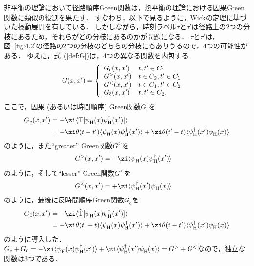 \documentclass[a4paper,10pt]{jsarticle}
\newcommand{\mH}{\mathrm{H}}
\begin{document}
非平衡の理論において径路順序Green関数は，熱平衡の理論における因果Green関数に類似の役割を果たす．
すなわち，以下で見るように，Wickの定理に基づいた摂動展開を有している．
しかしながら，時刻ラベル$\tau$と$\tau'$は径路上の2つの分枝にあるため，それらがどの分枝にあるのかが問題になる．
$\tau$と$\tau'$は，図~\ref{fig:4.2}の径路の2つの分枝のどちらの分枝にもありうるので，4つの可能性がある．
ゆえに，式~(\ref{def:G})は，4つの異なる関数を内包する．
\begin{align}
G (x, x')
	& = \left\{
	\begin{array}{l l}
		G_{\mathrm{c}} (x, x')
	&	t, t' \in C_1
	\\	G^{>} (x, x')
	&	t \in C_2, t' \in C_1
	\\	G^{<} (x, x')
	&	t \in C_1, t' \in C_2
	\\	G_{\tilde{\mathrm{c}}} (x, x')
	&	t, t' \in C_2
	.\end{array}
	\right.
\end{align}
ここで，因果 (あるいは時間順序) Green関数$G_{\mathrm{c}}$を
\begin{align}
G_{\mathrm{c}} (x, x')
	& = - \zi \langle \mathrm{T} [ \psi^{}_{\mH} (x) \psi^{\dagger}_{\mH} (x') ] \rangle
\notag \\
	& = - \zi \theta (t - t') \langle \psi^{}_{\mH} (x) \psi^{\dagger}_{\mH} (x') \rangle
		+ \zi \theta (t' - t) \langle \psi^{\dagger}_{\mH} (x') \psi^{}_{\mH} (x) \rangle
\label{def:G_c}
\end{align}
のように，また``greater'' Green関数$G^{>}$を
\begin{align}
G^{>} (x, x')
	& = - \zi \langle \psi^{}_{\mH} (x) \psi^{\dagger}_{\mH} (x') \rangle
\label{def:G_greater}
\end{align}
のように，そして``lesser'' Green関数$G^{<}$を
\begin{align}
G^{<} (x, x')
	& = + \zi \langle \psi^{\dagger}_{\mH} (x') \psi^{}_{\mH} (x) \rangle
\label{def:G_lesser}
\end{align}
のように，最後に反時間順序Green関数$G_{\tilde{\mathrm{c}}}$を
\begin{align}
G_{\tilde{\mathrm{c}}} (x, x')
	& = - \zi \langle \tilde{\mathrm{T}} [ \psi^{}_{\mH} (x) \psi^{\dagger}_{\mH} (x') ] \rangle
\notag \\
	& = - \zi \theta (t' - t) \langle \psi^{}_{\mH} (x) \psi^{\dagger}_{\mH} (x') \rangle
		+ \zi \theta (t - t') \langle \psi^{\dagger}_{\mH} (x') \psi^{}_{\mH} (x) \rangle
\label{def:G_antitime-ordered}
\end{align}
のように導入した．
$G_{\mathrm{c}} + G_{\tilde{\mathrm{c}}} = - \zi \langle \psi^{}_{\mH} (x) \psi^{\dagger}_{\mH} (x') \rangle + \zi \langle \psi^{\dagger}_{\mH} (x') \psi^{}_{\mH} (x) \rangle = G^{>} + G^{<}$なので，独立な関数は3つである．
\end{document}
